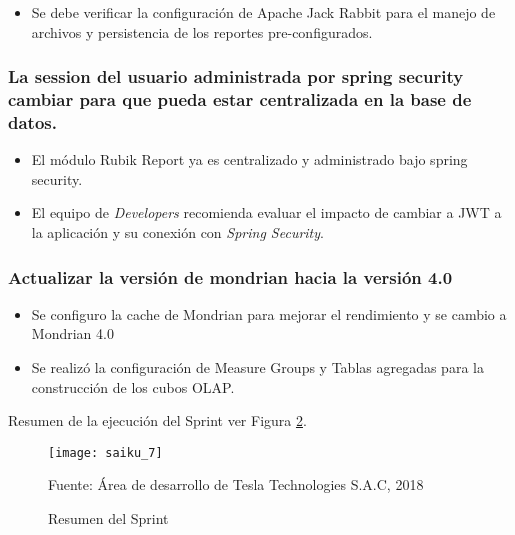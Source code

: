 \begin{spacing}{1.5}
\begin{itemize}
				\begin{figure}[H]
					\centering
					\texttt{[image: saiku\_6]}
					\caption {\centering \small{GiroSuite y Rubik-report desplegado en WebLogic 12.2.1.3}} \label{figure:chaperIII_9}
					\small {Fuente: \'{A}rea de desarrollo de Tesla Technologies S.A.C, 2018}
				\end{figure}
				
				\item Se debe verificar la configuraci\'{o}n de Apache Jack Rabbit para el manejo de archivos y persistencia de los reportes pre-configurados. 
			\end{itemize}
				
		\subsubsection{La session del usuario administrada por spring security cambiar para que pueda estar centralizada en la base de datos.}
			\begin{itemize}
				\item El m\'{o}dulo Rubik Report ya es centralizado y administrado bajo spring security.
				\item El equipo de \textit{Developers} recomienda evaluar el impacto de cambiar a JWT a la aplicaci\'{o}n y su conexi\'{o}n con \textit{Spring Security}.
			\end{itemize}			
		\subsubsection{Actualizar la versi\'{o}n de mondrian hacia la versi\'{on 4.0}}
		
		\begin{itemize}
			\item Se configuro la cache de Mondrian para mejorar el rendimiento y se cambio a Mondrian 4.0
			\item Se realiz\'{o} la configuraci\'{o}n de Measure Groups y Tablas agregadas para la construcci\'{o}n de los cubos OLAP.
		\end{itemize}
	
		Resumen de la ejecuci\'{o}n del Sprint ver Figura \ref{figure:chaperIII_10}.
		
		\begin{figure}[H]
			\centering
			\texttt{[image: saiku\_7]}
			\caption {\centering \small{Resumen del Sprint}} \label{figure:chaperIII_10}
			\small {Fuente: \'{A}rea de desarrollo de Tesla Technologies S.A.C, 2018}
		\end{figure}
		

\end{spacing}
